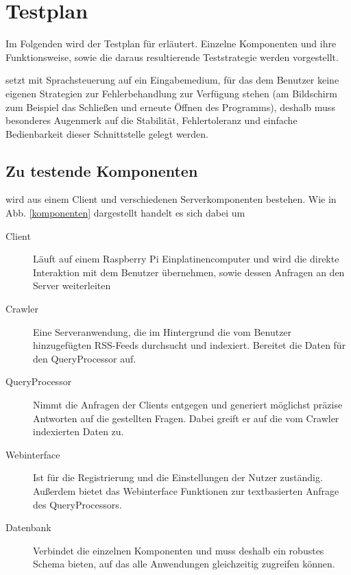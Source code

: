 
\chapter{Testplan}

Im Folgenden wird der Testplan für \NewsGenie erläutert. Einzelne Komponenten
und ihre Funktionsweise, sowie die daraus resultierende Teststrategie werden
vorgestellt. 

\NewsGenie setzt mit Sprachsteuerung auf ein Eingabemedium, für das dem Benutzer
keine eigenen Strategien zur Fehlerbehandlung zur Verfügung stehen (am
Bildschirm zum Beispiel das Schließen und erneute Öffnen des Programms),
deshalb muss besonderes Augenmerk auf die Stabilität, Fehlertoleranz und einfache
Bedienbarkeit dieser Schnittstelle gelegt werden.

\section{Zu testende Komponenten}

\NewsGenie wird aus einem Client und verschiedenen Serverkomponenten bestehen.
Wie in Abb. \ref{komponenten} dargestellt handelt es sich dabei um

\begin{description}
\item[Client] Läuft auf einem Raspberry Pi Einplatinencomputer und
wird die direkte Interaktion mit dem Benutzer übernehmen, sowie dessen Anfragen
an den Server weiterleiten
\item[Crawler] Eine Serveranwendung, die im Hintergrund die vom Benutzer
hinzugefügten RSS-Feeds durchsucht und indexiert. Bereitet die Daten für den
QueryProcessor auf.
\item[QueryProcessor] Nimmt die Anfragen der Clients entgegen und generiert
möglichst präzise Antworten auf die gestellten Fragen. Dabei greift er auf die
vom Crawler indexierten Daten zu.
\item[Webinterface] Ist für die Registrierung und die Einstellungen der Nutzer
zuständig. Außerdem bietet das Webinterface Funktionen zur textbasierten Anfrage
des QueryProcessors.
\item[Datenbank] Verbindet die einzelnen Komponenten und muss deshalb ein
robustes Schema bieten, auf das alle Anwendungen gleichzeitig zugreifen können.
\end{description}

